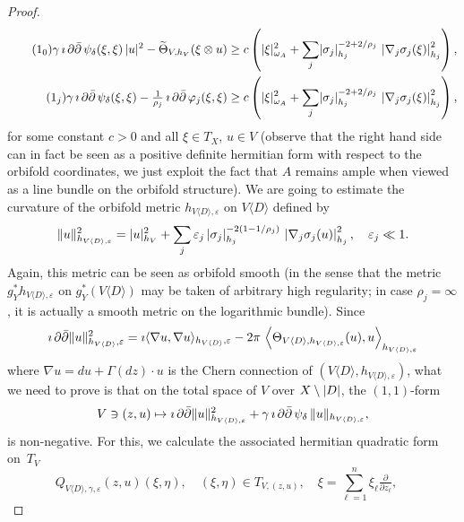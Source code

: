 \documentclass[10pt,a4paper]{article}
\DeclareMathOperator{\ddbar}{\partial\bar\partial}
\DeclarePairedDelimiter{\abs}{\lvert}{\rvert}
\DeclarePairedDelimiter{\Abs}{\lVert}{\rVert}
\numberwithin{equation}{section}
\begin{document}
\begin{proof}
\begin{align}
\stepcounter{equation}
\tag{$\theequation_0$}
\gamma\,\imath\ddbar\psi_\delta(\xi,\xi)\,\abs{u}^2-\widetilde\Theta_{V,h_V}(\xi\otimes u) &\ge c\left(\abs{\xi}_{\omega_A}^2+\sum_j\abs{\sigma_j}_{h_j}^{-2+2/\rho_j}\,\left|\nabla_j\sigma_j(\xi)\right|_{h_j}^2
\right),
\\
\tag{$\theequation_j$}\label{6.3_j}
\gamma\,\imath\ddbar\psi_\delta(\xi,\xi)-\tfrac{1}{\rho_j}\,\imath\ddbar\varphi_j(\xi,\xi) &\ge c\left(\abs{\xi}_{\omega_A}^2+\sum_j\abs{\sigma_j}_{h_j}^{-2+2/\rho_j}\,\left|\nabla_j\sigma_j(\xi)\right|_{h_j}^2
\right),
\end{align}
for some constant $c>0$ and all $\xi\in T_X$, $u\in V$ (observe that the right hand side can in fact be seen as a positive definite hermitian form with respect to the orbifold coordinates, we just exploit the fact that
$A$ remains ample when viewed as a line bundle on the orbifold structure). We are going to estimate the curvature of the orbifold metric
$h_{V\langle D\rangle,\varepsilon}$ on $V\langle D\rangle$ defined by
\begin{equation}\label{eq:orbi_metric}
\Abs{u}_{h_{V\langle D\rangle,\varepsilon}}^2 =
\abs{u}_{h_V}^2+\sum_j\varepsilon_j\,
\abs{\sigma_j}_{h_j}^{-2(1-1/\rho_j)}\,\left|\nabla_j\sigma_j(u)\right|_{h_j}^2,
\quad \varepsilon_j\ll 1.
\end{equation}
Again, this metric can be seen as orbifold smooth (in the sense that the metric $g_Y^*h_{V\langle D\rangle,\varepsilon}$ on $g_Y^*(V\langle D\rangle)$ may be taken of arbitrary high regularity; in case $\rho_j=\infty$, it is actually a smooth metric on the logarithmic bundle). Since
\[
\imath\ddbar\Abs{u}_{h_{V\langle D\rangle},\varepsilon}^2=
\imath\langle\nabla u,\nabla u\rangle_{h_{V\langle D\rangle},\varepsilon}-2\pi\,
\left\langle\Theta_{V\langle D\rangle,h_{V\langle D\rangle,\varepsilon}}(u),u
\right\rangle_{h_{V\langle D\rangle,\varepsilon}}
\]
where $\nabla u=du+\Gamma(dz)\cdot u$ is the Chern connection of
$(V\langle D\rangle,h_{V\langle D\rangle,\varepsilon})$, what we need to prove is that on the total space of $V$ over $X\setminus\abs{D}$, the $(1,1)$-form
\[
V\ni (z,u)\mapsto
\imath\ddbar\Abs{u}_{h_{V\langle D\rangle,\varepsilon}}^2+\gamma\,
\imath\ddbar\psi_\delta\,\Abs{u}_{h_{V\langle D\rangle,\varepsilon}},
\]
is non-negative. For this, we calculate the associated hermitian quadratic form on~$T_V$
\[
Q_{V\langle D\rangle,\gamma,\varepsilon}(z,u)(\xi,\eta),\quad (\xi,\eta)\in T_{V,(z,u)},\quad
\xi=\sum_{\ell=1}^n\xi_\ell\tfrac{\partial}{\partial z_\ell},\quad
\]
\end{proof}
\end{document}
